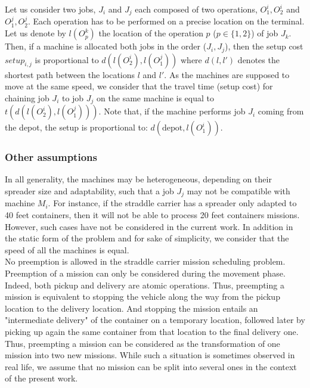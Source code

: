 \documentclass[review]{elsarticle}
\begin{document}
Let us consider two jobs, $J_i$ and $J_j$ each composed of two operations, $O^i_1, O^i_2$ and $O^j_1, O^j_2$. Each operation has to be performed on a precise location on the terminal. Let us denote by $l(O^k_p)$ the location of the operation $p$ ($p \in \{1,2\}$) of job $J_k$. Then, if a machine is allocated both jobs in the order ($J_i, J_j$), then the setup cost $setup_{i,j}$ is proportional to $d(l(O^i_2),l(O^j_1))$ where $d(l,l')$ denotes the shortest path between the locations $l$ and $l'$. As the machines are supposed to move at the same speed, we consider that the travel time (setup cost) for chaining job $J_i$ to job $J_j$ on the same machine is equal to $t(d(l(O^i_2),l(O^j_1)))$. Note that, if the machine performs job $J_i$ coming from the depot, the setup is proportional to: $d(\mbox{depot},l(O^i_1))$.

\subsubsection{Other assumptions}

In all generality, the machines may be heterogeneous, depending on their spreader size and adaptability, such that a job $J_j$ may not be compatible with machine $M_i$. For instance, if the straddle carrier has a spreader only adapted to 40 feet containers, then it will not be able to process 20 feet containers missions. However, such cases have not be considered in the current work. In addition in the static form of the problem and for sake of simplicity, we consider that the speed of all the machines is equal. \\

No preemption is allowed in the straddle carrier mission scheduling problem. Preemption of a mission can only be considered during the movement phase. Indeed, both pickup and delivery are atomic operations. Thus, preempting a mission is equivalent to stopping the vehicle along the way from the pickup location to the delivery location. And stopping the mission entails an "intermediate delivery" of the container on a temporary location, followed later by picking up again the same container from that location to the final delivery one. Thus, preempting a mission can be considered as the transformation of one mission into two new missions. While such a situation is sometimes observed in real life, we assume that no mission can be split into several ones in the context of the present work.\\
\end{document}
